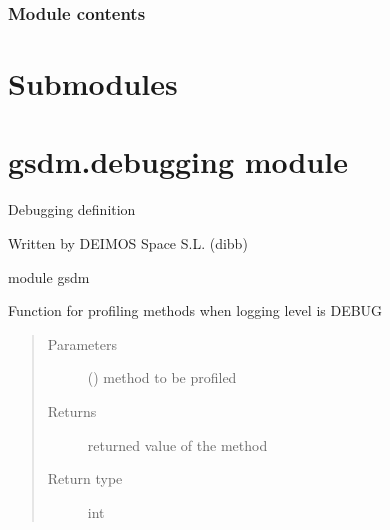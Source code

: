 
\begin{fulllineitems}
\label{\detokenize{gsdm.engine:gsdm.engine.query.log_query}}
\end{fulllineitems}



\subsubsection{Module contents}
\label{\detokenize{gsdm.engine:module-gsdm.engine}}\label{\detokenize{gsdm.engine:module-contents}}

\section{Submodules}
\label{\detokenize{gsdm:submodules}}

\section{gsdm.debugging module}
\label{\detokenize{gsdm:module-gsdm.debugging}}\label{\detokenize{gsdm:gsdm-debugging-module}}
Debugging definition

Written by DEIMOS Space S.L. (dibb)

module gsdm

\begin{fulllineitems}
\label{\detokenize{gsdm:gsdm.debugging.debug}}
Function for profiling methods when logging level is DEBUG
\begin{quote}\begin{description}
\item[{Parameters}] \leavevmode
{} () \textendash{} method to be profiled

\item[{Returns}] \leavevmode
returned value of the method

\item[{Return type}] \leavevmode
int

\end{description}\end{quote}

\end{fulllineitems}

